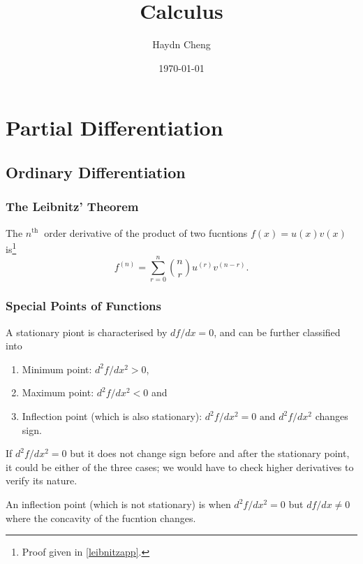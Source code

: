 \documentclass[english,a4paper,12pt]{report}
\title{Calculus}
\author{Haydn Cheng}
\date{\today}
\begin{document}
\maketitle
\tableofcontents

\chapter{Partial Differentiation}

\section{Ordinary Differentiation}

\subsection{The Leibnitz' Theorem} \label{leibnitz} 
\begin{theorem}
    The \(n^{\text{th }} \) order derivative of the product of two fucntions \(f(x) = u(x)v(x)\) is\footnote{Proof given in \cref{leibnitzapp}.}  
    \begin{equation}
        f^{(n)} = \sum_{r=0}^{n} \binom{n}{r} u^{(r)} v^{(n-r)}. \label{lei} 
    \end{equation}
\end{theorem}

\subsection{Special Points of Functions}

A stationary piont is characterised by \( df /dx = 0\), and can be further classified into 

\begin{enumerate}
    \item Minimum point: \( d^2f / dx^2 > 0\),
    \item Maximum point: \(d^2f / dx^2 < 0\) and
    \item Inflection point (which is also stationary): \(d^2f / dx^2 = 0 \text { and }  d^2f / dx^2\)  changes sign.
\end{enumerate}

If \(d^2f / dx^2 = 0\) but it does not change sign before and after the stationary point, it could be either of the three cases; we would have to check higher derivatives to verify its nature. 

An inflection point (which is not stationary) is when \(d^2f / dx^2 = 0\) but \(df/dx \neq 0\) where the concavity of the fucntion changes.  
\end{document}
